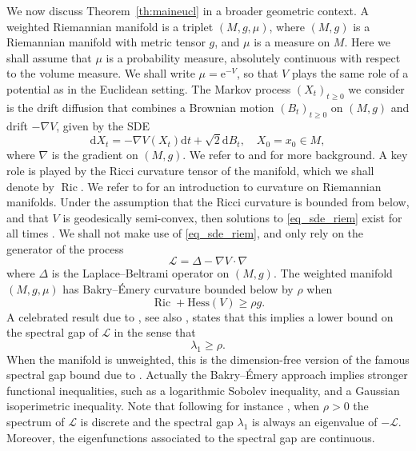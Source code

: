 \documentclass[10pt,reqno]{amsart}
\numberwithin{equation}{section}
\begin{document}
We now discuss Theorem~\ref{th:maineucl} in a broader geometric context. A
weighted Riemannian manifold is a triplet $(M, g, \mu)$, where $(M, g)$ is a
Riemannian manifold with metric tensor $g$, and $\mu$ is a measure on $M$.
Here we shall assume that $\mu$ is a probability measure, absolutely
continuous with respect to the volume measure. We shall write
$\mu =\mathrm{e}^{-V}$, so that $V$ plays the same role of a potential as in
the Euclidean setting. The Markov process ${(X_t)}_{t\geq0}$ we consider is
the drift diffusion that combines a Brownian motion ${(B_t)}_{t \geq 0}$ on
$(M, g)$ and drift $-\nabla V$, given by the SDE
\begin{equation} \label{eq_sde_riem}
  \mathrm{d}X_t = -\nabla V(X_t)\mathrm{d}t + \sqrt{2}\mathrm{d}B_t,
  \quad X_0=x_0\in M,
\end{equation}
where $\nabla$ is the gradient on $(M,g)$. We refer to \cite{BGL14} and \cite{Hsu} for
more background. A key role is played by the Ricci curvature tensor of the
manifold, which we shall denote by $\operatorname{Ric}$. We refer to
\cite{Oll13} for an introduction to curvature on Riemannian manifolds. Under
the assumption that the Ricci curvature is bounded from below, and that $V$ is
geodesically semi-convex, then solutions to \eqref{eq_sde_riem}
exist for all times \cite[Th.~11.8]{Grig}. We shall not make use of 
\eqref{eq_sde_riem}, and only rely on the generator of the process
\begin{equation}\label{eq:L:riem}
\mathcal{L} = \Delta - \nabla V \cdot \nabla
\end{equation}
where $\Delta$ is the Laplace--Beltrami operator on $(M,g)$. The weighted
manifold $(M, g, \mu)$ has Bakry--Émery curvature bounded below by $\rho$
when
\begin{equation}\label{eq:BErho}
  \operatorname{Ric} + \mathrm{Hess}(V) \geq \rho g.
\end{equation}
A celebrated result due to \cite{BE85}, see
also \cite{BGL14}, states that this implies a lower bound on the spectral gap
of $\mathcal{L}$ in the sense that
\begin{equation}
\lambda_1 \geq \rho. 
\end{equation}
When the manifold is unweighted, this is the dimension-free version of the
famous spectral gap bound due to \cite{Lic58}. Actually the Bakry--Émery
approach implies stronger functional inequalities, such as a logarithmic
Sobolev inequality, and a Gaussian isoperimetric inequality. Note that
following for instance \cite[Prop.~6.7]{GMS15}, when $\rho > 0$ the spectrum
of $\mathcal{L}$ is discrete and the spectral gap $\lambda_1$ is always an
eigenvalue of $-\mathcal{L}$. Moreover, the eigenfunctions associated to the
spectral gap are continuous.
\end{document}
